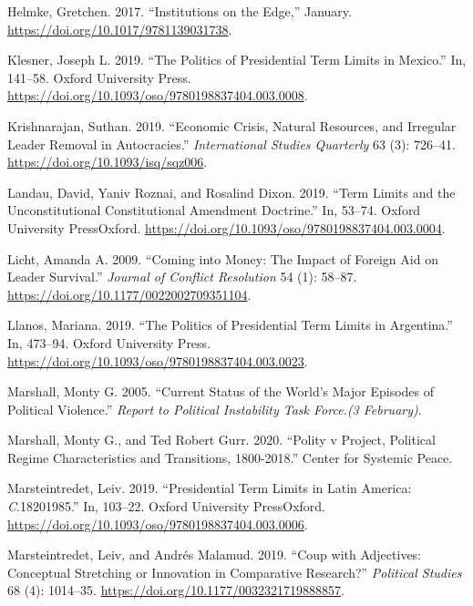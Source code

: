 \documentclass[
  12pt,
]{report}
\newlength{\cslhangindent}
\newenvironment{CSLReferences}[2] %
 {\begin{list}{}{%
  \setlength{\itemindent}{0pt}
  \setlength{\leftmargin}{0pt}
  \setlength{\parsep}{0pt}
  \ifodd #1
   \setlength{\leftmargin}{\cslhangindent}
   \setlength{\itemindent}{-1\cslhangindent}
  \fi
  \setlength{\itemsep}{#2\baselineskip}}}
 {\end{list}}
\begin{document}
\begin{CSLReferences}{1}{0}
Helmke, Gretchen. 2017. {``Institutions on the Edge,''} January.
\url{https://doi.org/10.1017/9781139031738}.

Klesner, Joseph L. 2019. {``The Politics of Presidential Term Limits in
Mexico.''} In, 141--58. Oxford University Press.
\url{https://doi.org/10.1093/oso/9780198837404.003.0008}.

Krishnarajan, Suthan. 2019. {``Economic Crisis, Natural Resources, and
Irregular Leader Removal in Autocracies.''} \emph{International Studies
Quarterly} 63 (3): 726--41. \url{https://doi.org/10.1093/isq/sqz006}.

Landau, David, Yaniv Roznai, and Rosalind Dixon. 2019. {``Term Limits
and the Unconstitutional Constitutional Amendment Doctrine.''} In,
53--74. Oxford University PressOxford.
\url{https://doi.org/10.1093/oso/9780198837404.003.0004}.

Licht, Amanda A. 2009. {``Coming into Money: The Impact of Foreign Aid
on Leader Survival.''} \emph{Journal of Conflict Resolution} 54 (1):
58--87. \url{https://doi.org/10.1177/0022002709351104}.

Llanos, Mariana. 2019. {``The Politics of Presidential Term Limits in
Argentina.''} In, 473--94. Oxford University Press.
\url{https://doi.org/10.1093/oso/9780198837404.003.0023}.

Marshall, Monty G. 2005. {``Current Status of the World's Major Episodes
of Political Violence.''} \emph{Report to Political Instability Task
Force.(3 February)}.

Marshall, Monty G., and Ted Robert Gurr. 2020. {``Polity v Project,
Political Regime Characteristics and Transitions, 1800-2018.''} Center
for Systemic Peace.

Marsteintredet, Leiv. 2019. {``Presidential Term Limits in Latin
America: {\emph{C}}.1820{\textendash}1985.''} In, 103--22. Oxford
University PressOxford.
\url{https://doi.org/10.1093/oso/9780198837404.003.0006}.

Marsteintredet, Leiv, and Andrés Malamud. 2019. {``Coup with Adjectives:
Conceptual Stretching or Innovation in Comparative Research?''}
\emph{Political Studies} 68 (4): 1014--35.
\url{https://doi.org/10.1177/0032321719888857}.


\end{CSLReferences}
\end{document}
